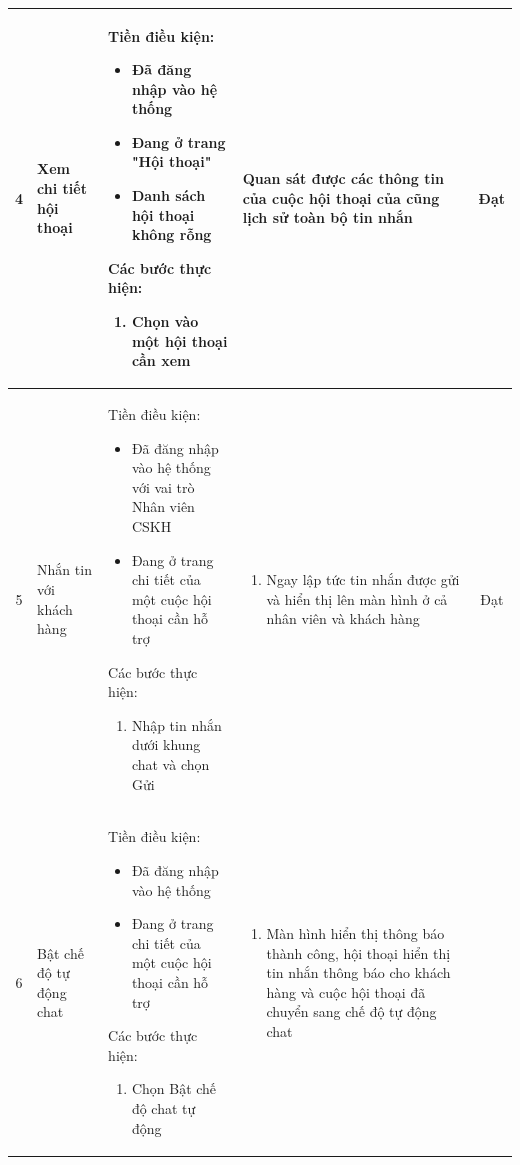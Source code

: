 \begin{longtable}{|c|m{2.5cm}|m{5.5cm}|m{4.5cm}|c|}
    \hline
    4 & 
    Xem chi tiết hội thoại & 
    Tiền điều kiện:
    \begin{itemize}
        \item Đã đăng nhập vào hệ thống
        \item Đang ở trang "Hội thoại"
        \item Danh sách hội thoại không rỗng
    \end{itemize}
    Các bước thực hiện: 
    \begin{enumerate}[label=\arabic*.]
        \item Chọn vào một hội thoại cần xem
    \end{enumerate}
    & 
    Quan sát được các thông tin của cuộc hội thoại của cũng lịch sử toàn bộ tin nhắn & Đạt \\
    \hline
    5 & 
    Nhắn tin với khách hàng& 
    Tiền điều kiện:
    \begin{itemize}
        \item Đã đăng nhập vào hệ thống với vai trò Nhân viên CSKH
        \item Đang ở trang chi tiết của một cuộc hội thoại cần hỗ trợ
    \end{itemize}
    Các bước thực hiện: 
    \begin{enumerate}[label=\arabic*.]
        \item Nhập tin nhắn dưới khung chat và chọn Gửi
    \end{enumerate}
    & 
    \begin{enumerate}[label=\arabic*.]
        \item Ngay lập tức tin nhắn được gửi và hiển thị lên màn hình ở cả nhân viên và khách hàng
    \end{enumerate} & Đạt \\
    \hline
    6 & 
    Bật chế độ tự động chat & 
    Tiền điều kiện:
    \begin{itemize}
        \item Đã đăng nhập vào hệ thống
        \item Đang ở trang chi tiết của một cuộc hội thoại cần hỗ trợ
    \end{itemize}
    Các bước thực hiện: 
    \begin{enumerate}[label=\arabic*.]
        \item Chọn Bật chế độ chat tự động
    \end{enumerate}
    & 
    \begin{enumerate}[label=\arabic*.]
        \item Màn hình hiển thị thông báo thành công, hội thoại hiển thị tin nhắn thông báo cho khách hàng và cuộc hội thoại đã chuyển sang chế độ tự động chat

\end{enumerate}
\end{longtable}
